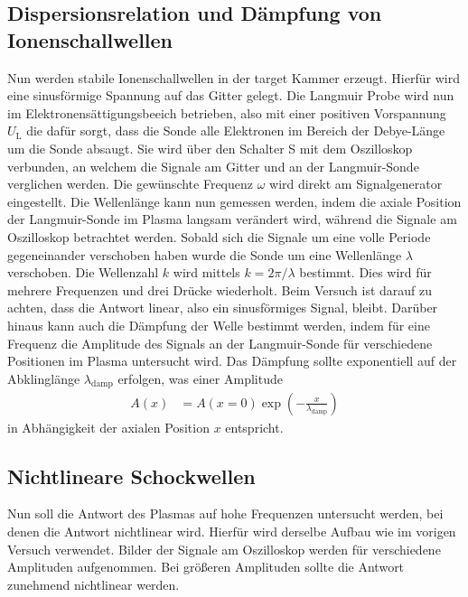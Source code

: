 \subsection{Dispersionsrelation und D\"ampfung von Ionenschallwellen}
Nun werden stabile Ionenschallwellen in der target Kammer erzeugt.
Hierf\"ur wird eine sinusf\"ormige Spannung auf das Gitter gelegt.
Die Langmuir Probe wird nun im Elektronens\"attigungsbeeich betrieben, also mit einer positiven Vorspannung $U_\text{L}$ die daf\"ur sorgt, dass die Sonde alle Elektronen im Bereich der Debye-L\"ange um die Sonde absaugt.
Sie wird \"uber den Schalter S mit dem Oszilloskop verbunden, an welchem die Signale am Gitter und an der Langmuir-Sonde verglichen werden.
Die gew\"unschte Frequenz $\omega$ wird direkt am Signalgenerator eingestellt.
Die Wellenl\"ange kann nun gemessen werden, indem die axiale Position der Langmuir-Sonde im Plasma langsam ver\"andert wird, w\"ahrend die Signale am Oszilloskop betrachtet werden.
Sobald sich die Signale um eine volle Periode gegeneinander verschoben haben wurde die Sonde um eine Wellenl\"ange $\lambda$ verschoben.
Die Wellenzahl $k$ wird mittels $k=2\pi/\lambda$ bestimmt.
Dies wird f\"ur mehrere Frequenzen und drei Dr\"ucke wiederholt.
Beim Versuch ist darauf zu achten, dass die Antwort linear, also ein sinusf\"ormiges Signal, bleibt.
Dar\"uber hinaus kann auch die D\"ampfung der Welle bestimmt werden, indem f\"ur eine Frequenz die Amplitude des Signals an der Langmuir-Sonde f\"ur verschiedene Positionen im Plasma untersucht wird.
Das D\"ampfung sollte exponentiell auf der Abklingl\"ange $\lambda_\text{damp}$ erfolgen, was einer Amplitude
\begin{align}
A(x)
    &=A(x=0)\exp(-\frac{x}{\lambda_\text{damp}})
    \label{eq:A}
\end{align}
in Abh\"angigkeit der axialen Position $x$ entspricht.

\subsection{Nichtlineare Schockwellen}
Nun soll die Antwort des Plasmas auf hohe Frequenzen untersucht werden, bei denen die Antwort nichtlinear wird.
Hierf\"ur wird derselbe Aufbau wie im vorigen Versuch verwendet.
Bilder der Signale am Oszilloskop werden f\"ur verschiedene Amplituden aufgenommen.
Bei gr\"o\ss eren Amplituden sollte die Antwort zunehmend nichtlinear werden.
\cite{anleitung2}
\FloatBarrier
